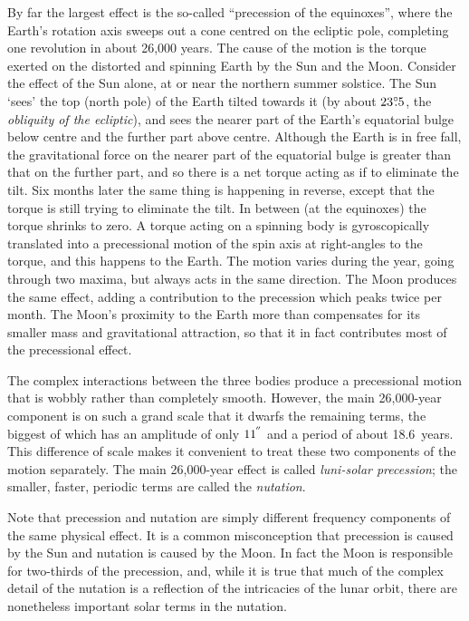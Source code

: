 \documentclass[11pt,twoside]{article}
\newcommand{\degree}[2] {$#1^{\circ}
                        \hspace{-0.37em}.\hspace{0.02em}#2$}
\newcommand{\arcseci}[1] {$#1\hspace{-0.05em}$\raisebox{-0.5ex}
                         {$^{'\hspace{-0.1em}'}$}}
\renewcommand{\arcseci}[1] {$#1\hspace{-0.05em}^{'\hspace{-0.1em}'}$}
\begin{document}
By far the largest effect is the
so-called ``precession of the equinoxes'', where the Earth's
rotation axis sweeps out a cone centred on the ecliptic
pole, completing one revolution in about 26,000 years.  The
cause of the motion is the torque exerted on the distorted and
spinning Earth by the Sun and the Moon.  Consider the effect of the
Sun alone, at or near the northern summer solstice.  The Sun
`sees' the top (north pole) of the Earth tilted towards it
(by about \degree{23}{5}, the {\it obliquity of the
ecliptic}\/),
and sees the nearer part of the Earth's equatorial bulge
below centre and the further part above centre.
Although the Earth is in free fall,
the gravitational force on the nearer part of the
equatorial bulge is greater than that on the further part, and
so there is a net torque acting
as if to eliminate the tilt.  Six months later the same thing
is happening in reverse, except that the torque is still
trying to eliminate the tilt.  In between (at the equinoxes) the
torque shrinks to zero.  A torque acting on a spinning body
is gyroscopically translated
into a precessional motion of the spin axis at right-angles to the torque,
and this happens to the Earth.
The motion varies during the
year, going through two maxima, but always acts in the
same direction.  The Moon produces the same effect,
adding a contribution to the precession which peaks twice
per month.  The Moon's proximity to the Earth more than compensates
for its smaller mass and gravitational attraction, so that it
in fact contributes most of the precessional effect.

The complex interactions between the three bodies produce a
precessional motion that is wobbly rather than completely smooth.
However, the main 26,000-year component is on such a grand scale that
it dwarfs the remaining terms, the biggest of
which has an amplitude of only \arcseci{11} and a period of
about 18.6~years.  This difference of scale makes it convenient to treat
these two components of the motion separately.  The main 26,000-year
effect is called {\it luni-solar precession};  the smaller,
faster, periodic terms are called the {\it nutation}.

Note that precession and nutation are simply
different frequency components of the same physical effect.  It is
a common misconception that precession is caused
by the Sun and nutation is caused by the Moon.  In fact
the Moon is responsible for two-thirds of the precession, and,
while it is true that much of the complex detail of the nutation is
a reflection of the intricacies of the lunar orbit, there are
nonetheless important solar terms in the nutation.
\end{document}
